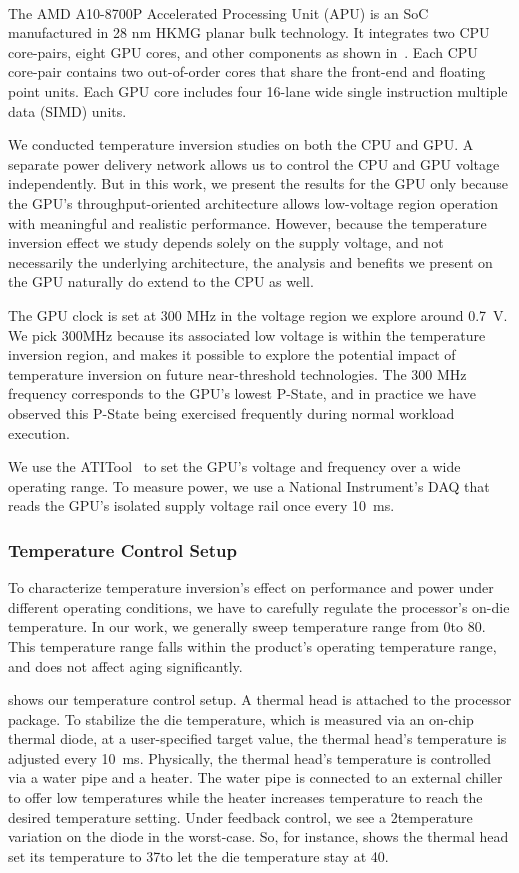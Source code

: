 The AMD\textsuperscript{\textregistered} A10-8700P Accelerated Processing Unit (APU) is an SoC manufactured in 28 nm HKMG planar bulk technology. It integrates two CPU core-pairs, eight GPU cores, and other components as shown in~. Each CPU core-pair contains two out-of-order cores that share the front-end and floating point units. Each GPU core includes four 16-lane wide single instruction multiple data (SIMD) units. 

We conducted temperature inversion studies on both the CPU and GPU. A separate power delivery network allows us to control the CPU and GPU voltage independently. But in this work, we present the results for the GPU only because the GPU's throughput-oriented architecture allows low-voltage region operation with meaningful and realistic performance. However, because the temperature inversion effect we study depends solely on the supply voltage, and not necessarily the underlying architecture, the analysis and benefits we present on the GPU naturally do extend to the CPU as well.

The GPU clock is set at 300 MHz in the voltage region we explore around 0.7~V. We pick 300MHz because its associated low voltage is within the temperature inversion region, and makes it possible to explore the potential impact of temperature inversion on future near-threshold technologies. The 300 MHz frequency corresponds to the GPU's lowest P-State, and in practice we have observed this P-State being exercised frequently during normal workload execution. 

We use the ATITool~\cite{atitool} to set the GPU's voltage and frequency over a wide operating range. To measure power, we use a National Instrument's DAQ that reads the GPU's isolated supply voltage rail once every 10~ms.

\subsubsection{Temperature Control Setup}
\label{sec:tistate:setup:temp}

To characterize temperature inversion's effect on performance and power under different operating conditions, we have to carefully regulate the processor's on-die temperature. In our work, we generally sweep temperature range from 0\C to 80\C. This temperature range falls within the product's operating temperature range, and does not affect aging significantly.

 shows our temperature control setup. A thermal head is attached to the processor package. To stabilize the die temperature, which is measured via an on-chip thermal diode, at a user-specified target value, the thermal head's temperature is adjusted every 10~ms. Physically, the thermal head's temperature is controlled via a water pipe and a heater. The water pipe is connected to an external chiller to offer low temperatures while the heater increases temperature to reach the desired temperature setting. Under feedback control, we see a 2\C temperature variation on the diode in the worst-case. So, for instance,  shows the thermal head set its temperature to 37\C to let the die temperature stay at 40\C. 

